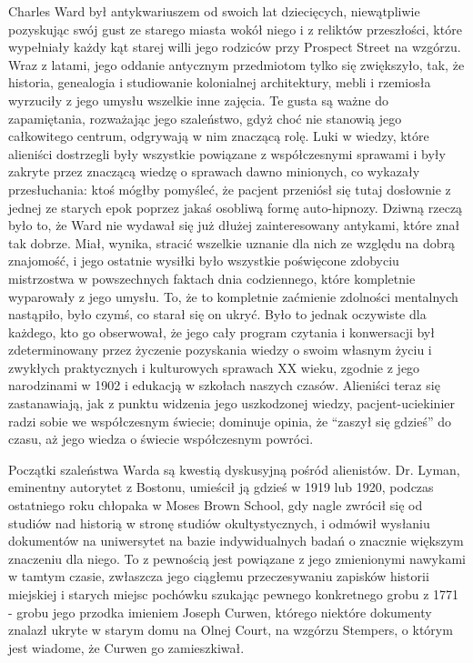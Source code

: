 Charles Ward był antykwariuszem od swoich lat dziecięcych, niewątpliwie pozyskując swój gust ze starego miasta wokół niego i z reliktów przeszłości, które wypełniały każdy kąt starej willi jego rodziców przy Prospect Street na wzgórzu. Wraz z latami, jego oddanie antycznym przedmiotom tylko się zwiększyło, tak, że historia, genealogia i studiowanie kolonialnej architektury, mebli i rzemiosła wyrzuciły z jego umysłu wszelkie inne zajęcia. Te gusta są ważne do zapamiętania, rozważając jego szaleństwo, gdyż choć nie stanowią jego całkowitego centrum, odgrywają w nim znaczącą rolę. Luki w wiedzy, które alieniści dostrzegli były wszystkie powiązane z współczesnymi sprawami i były zakryte przez znaczącą wiedzę o sprawach dawno minionych, co wykazały przesłuchania: ktoś mógłby pomyśleć, że pacjent przeniósł się tutaj dosłownie z jednej ze starych epok poprzez jakaś osobliwą formę auto-hipnozy. Dziwną rzeczą było to, że Ward nie wydawał się już dłużej zainteresowany antykami, które znał tak dobrze. Miał, wynika, stracić wszelkie uznanie dla nich ze względu na dobrą znajomość, i jego ostatnie wysiłki było wszystkie poświęcone zdobyciu mistrzostwa w powszechnych faktach dnia codziennego, które kompletnie wyparowały z jego umysłu. To, że to kompletnie zaćmienie zdolności mentalnych nastąpiło, było czymś, co starał się on ukryć. Było to jednak oczywiste dla każdego, kto go obserwował, że jego cały program czytania i konwersacji był zdeterminowany przez życzenie pozyskania wiedzy o swoim własnym życiu i zwykłych praktycznych i kulturowych sprawach XX wieku, zgodnie z jego narodzinami w 1902 i edukacją w szkołach naszych czasów. Alieniści teraz się zastanawiają, jak z punktu widzenia jego uszkodzonej wiedzy, pacjent-uciekinier radzi sobie we współczesnym świecie; dominuje opinia, że ``zaszył się gdzieś'' do czasu, aż jego wiedza o świecie współczesnym powróci.

Początki szaleństwa Warda są kwestią dyskusyjną pośród alienistów. Dr. Lyman, eminentny autorytet z Bostonu, umieścił ją gdzieś w 1919 lub 1920, podczas ostatniego roku chłopaka w Moses Brown School, gdy nagle zwrócił się od studiów nad historią w stronę studiów okultystycznych, i odmówił wysłaniu dokumentów na uniwersytet na bazie indywidualnych badań o znacznie większym znaczeniu dla niego. To z pewnością jest powiązane z jego zmienionymi nawykami w tamtym czasie, zwłaszcza jego ciągłemu przeczesywaniu zapisków historii miejskiej i starych miejsc pochówku szukając pewnego konkretnego grobu z 1771 - grobu jego przodka imieniem Joseph Curwen, którego niektóre dokumenty znalazł ukryte w starym domu na Olnej Court, na wzgórzu Stempers, o którym jest wiadome, że Curwen go zamieszkiwał. 

